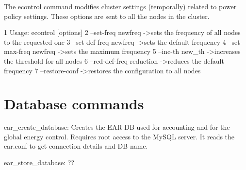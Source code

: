 The econtrol command modifies cluster settings (temporally) related to power policy settings. These options are sent to all the nodes in the cluster.


\begin{DoxyCode}
1 Usage: econtrol [options]
2     --set-freq  newfreq     ->sets the frequency of all nodes to the requested one
3     --set-def-freq  newfreq     ->sets the default frequency
4     --set-max-freq  newfreq     ->sets the maximum frequency
5     --inc-th    new\_th      ->increases the threshold for all nodes
6     --red-def-freq  reduction   ->reduces the default frequency
7     --restore-conf          ->restores the configuration to all nodes
\end{DoxyCode}


\section*{Database commands}


\begin{DoxyItemize}
\item ear\+\_\+create\+\_\+database\+: Creates the E\+AR DB used for accounting and for the global energy control. Requires root access to the My\+S\+QL server. It reads the ear.\+conf to get connection details and DB name.
\item ear\+\_\+store\+\_\+database\+: ?? 
\end{DoxyItemize}